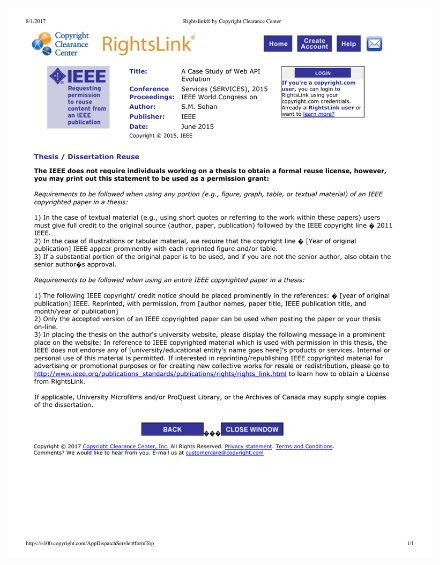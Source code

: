 \begin{figure}
 \centering
 \includegraphics[width=\textwidth]{copyrights/services.pdf}
\end{figure}
